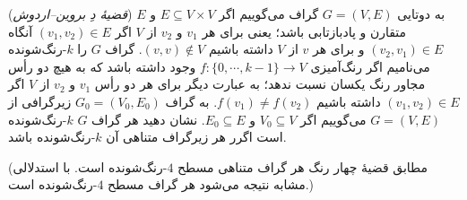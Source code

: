(\emph{قضیهٔ دِ بروین--اردوش})
به دوتایی
$G=(V,E)$
گراف می‌گوییم اگر
$E\subseteq V\times V$
و
$E$
متقارن و پادبازتابی باشد؛ یعنی برای هر
$v_1$
و
$v_2$
از
$V$
اگر
$(v_1,v_2)\in E$
آنگاه
$(v_2,v_1)\in E$
و
برای هر
$v$
از
$V$
داشته باشیم
$(v,v)\not\in V$.
گراف
$G$
را
$k$-رنگ‌شونده
می‌نامیم اگر رنگ‌آمیزی
$f\colon\{0,\cdots,k-1\}\to V$
وجود داشته باشد که به هیچ دو رأس مجاور رنگ یکسان نسبت ندهد؛ به عبارت دیگر برای هر دو رأس
$v_1$
و
$v_2$
از
$V$
اگر
$(v_1,v_2)\in E$
داشته باشیم
$f(v_1)\neq f(v_2)$.
به گراف
$G_0=(V_0,E_0)$
زیرگرافی از
$G=(V,E)$
می‌گوییم
اگر
$V_0\subseteq V$
و
$E_0\subseteq E$.
نشان دهید هر گراف
$G$
$k$-رنگ‌شونده
است اگرر
هر زیرگراف متناهی آن
$k$-رنگ‌شونده
باشد.

(مطابق قضیهٔ چهار رنگ هر گراف متناهی مسطح
$4$-رنگ‌شونده
است. با استدلالی مشابه نتیجه می‌شود هر گراف مسطح  $4$-رنگ‌شونده
است.)
